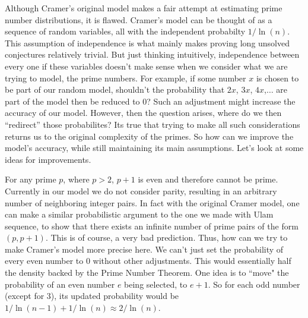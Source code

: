 \documentclass[conference]{IEEEtran}
\begin{document}
Although Cramer's original model makes a fair attempt at estimating prime number distributions, it is flawed. Cramer's model can be thought of as a sequence of random variables, all with the independent probabilty $1 / \ln(n)$. This assumption of independence is what mainly makes proving long unsolved conjectures relatively trivial. But just thinking intuitively, independence between every one if these variables doesn't make sense when we consider what we are trying to model, the prime numbers. For example, if some number $x$ is chosen to be part of our random model, shouldn't the probability that $2x$, $3x$, $4x$,$\dots$ are part of the model then be reduced to 0? Such an adjustment might increase the accuracy of our model. However, then the question arises, where do we then ``redirect'' those probabilites? Its true that trying to make all such considerations returns us to the original complexity of the primes. So how can we improve the model's accuracy, while still maintaining its main assumptions. Let's look at some ideas for improvements. 

For any prime $p$, where $p > 2$, $p + 1$ is even and therefore cannot be prime. Currently in our model we do not consider parity, resulting in an arbitrary number of neighboring integer pairs. In fact with the original Cramer model, one can make a similar probabilistic argument to the one we made with Ulam sequence, to show that there exists an infinite number of prime pairs of the form $(p, p + 1)$. This is of course, a very bad prediction. Thus, how can we try to make Cramer's model more precise here. We can't just set the probability of every even number to 0 without other adjustments. This would essentially half the density backed by the Prime Number Theorem. One idea is to ``move" the probability of an even number $e$ being selected, to $e + 1$. So for each odd number (except for 3), its updated probability would be $1 / \ln(n - 1) + 1 / \ln(n) \approx 2 / \ln(n)$.
\end{document}
